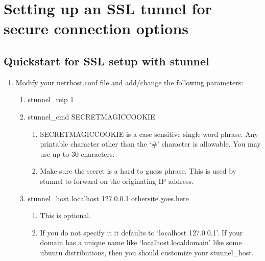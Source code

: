 \documentclass[letterpaper,10pt,english]{sphinxmanual}
\begin{document}
\section{Setting up an SSL tunnel for secure connection options}
\label{\detokenize{security:setting-up-an-ssl-tunnel-for-secure-connection-options}}

\subsection{Quickstart for SSL setup with stunnel}
\label{\detokenize{security:quickstart-for-ssl-setup-with-stunnel}}\begin{enumerate}
%
\item {} 
\sphinxAtStartPar
Modify your netrhost.conf file and add/change the following parameters:
\begin{enumerate}
%
\item {} 
\sphinxAtStartPar
stunnel\_reip 1

\item {} 
\sphinxAtStartPar
stunnel\_cmd SECRET\sphinxhyphen{}MAGIC\sphinxhyphen{}COOKIE
\begin{enumerate}
%
\item {} 
\sphinxAtStartPar
SECRET\sphinxhyphen{}MAGIC\sphinxhyphen{}COOKIE is a case sensitive single word phrase. Any printable character other than the ‘\#’ character is allowable.  You may use up to 30 characters.

\item {} 
\sphinxAtStartPar
Make sure the secret is a hard to guess phrase.  This is used by stunnel to forward on the originating IP address.

\end{enumerate}

\item {} 
\sphinxAtStartPar
stunnel\_host localhost 127.0.0.1 othersite.goes.here
\begin{enumerate}
%
\item {} 
\sphinxAtStartPar
This is optional.

\item {} 
\sphinxAtStartPar
If you do not specify it it defaults to ‘localhost 127.0.0.1’.  If your domain has a unique name like ‘localhost.localdomain’ like some ubuntu distributions, then you should customize your stunnel\_host.


\end{enumerate}
\end{enumerate}
\end{enumerate}
\end{document}
